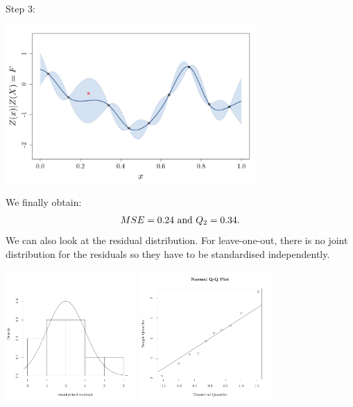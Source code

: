 \documentclass{beamer}
\begin{document}
\begin{frame}{}
Step 3:\\ \vspace{3mm}
\begin{center}
\includegraphics[height=6cm]{figures/VALID_crossval3}
\end{center}
\end{frame}

\begin{frame}{}
We finally obtain:
 $$MSE = 0.24 \text{ and } Q_2 = 0.34.\vspace{3mm}$$
We can also look at the residual distribution. For leave-one-out, there is no joint distribution for the residuals so they have to be standardised independently.
\begin{center}
\includegraphics[height=5cm]{figures/VALID_crossvalhist} \qquad
\includegraphics[height=5cm]{figures/VALID_crossvalqqplot}
\end{center}
\end{frame}
\end{document}
